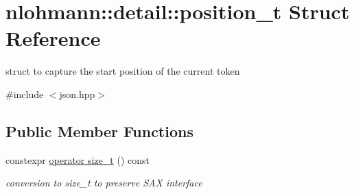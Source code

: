 \hypertarget{structnlohmann_1_1detail_1_1position__t}{}\section{nlohmann\+:\+:detail\+:\+:position\+\_\+t Struct Reference}
\label{structnlohmann_1_1detail_1_1position__t}


struct to capture the start position of the current token  




{\ttfamily \#include $<$json.\+hpp$>$}

\subsection*{Public Member Functions}
\begin{DoxyCompactItemize}
\item 
\mbox{\label{structnlohmann_1_1detail_1_1position__t_ac9ad1e0f143f162e2e0c979cd678d683}} 
constexpr \hyperlink{structnlohmann_1_1detail_1_1position__t_ac9ad1e0f143f162e2e0c979cd678d683}{operator size\+\_\+t} () const
\begin{DoxyCompactList}\small\item\em conversion to size\+\_\+t to preserve S\+AX interface \end{DoxyCompactList}\end{DoxyCompactItemize}
